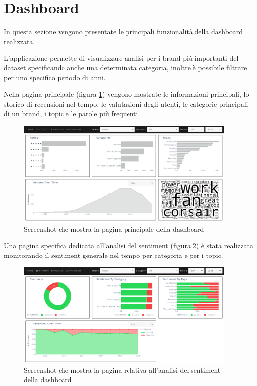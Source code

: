 \section{Dashboard}
In questa sezione vengono presentate le principali funzionalità della dashboard realizzata.

L'applicazione permette di visualizzare analisi per i brand più importanti del dataset specificando anche una determinata categoria, inoltre è possibile filtrare per uno specifico periodo di anni.

Nella pagina principale (figura \ref{fig:dashboard1}) vengono mostrate le informazioni principali, lo storico di recensioni nel tempo, le valutazioni degli utenti, le categorie principali di un brand, i topic e le parole più frequenti.

\begin{figure}[ht]
  \centering
  \includegraphics[width=0.95\textwidth]{images/dashboard/dashboard_home.png}
  \caption{Screenshot che mostra la pagina principale della dashboard}
  \label{fig:dashboard1}
\end{figure}

Una pagina specifica dedicata all'analisi del sentiment (figura \ref{fig:dashboard2}) è stata realizzata monitorando il sentiment generale nel tempo per categoria e per i topic.

\begin{figure}[ht]
  \centering
  \includegraphics[width=0.95\textwidth]{images/dashboard/dashboard_sentiment.png}
  \caption{Screenshot che mostra la pagina relativa all'analisi del sentiment della dashboard}
  \label{fig:dashboard2}
\end{figure}

